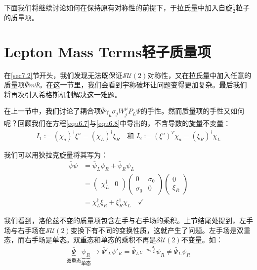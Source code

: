 下面我们将继续讨论如何在保持原有对称性的前提下，于拉氏量中加入自旋$\frac{1}{2}$粒子的质量项。


\section[轻子质量项]{Lepton Mass Terms\quad 轻子质量项}\label{sec7.5}

在\ref{sec7.2}节开头，我们发现无法既保证$\mathcal{SU}(2)$对称性，又在拉氏量中加入任意的质量项$\bar{\Psi}m\Psi$。在这一节里，我们会看到宇称破坏让问题变得更加复杂。最后我们将再次引入希格斯机制解决这一难题。

在上一节中，我们讨论了耦合项$\bar{\Psi}\gamma_\mu\sigma_jW_j^\mu P_L\Psi$的手性。然而质量项的手性又如何呢？回顾我们在方程\ref{equ6.7}与\ref{equ6.8}中导出的，不含导数的旋量不变量：
\begin{align}
I_1:=(\chi_a)^\dag\xi^{\dot a}=(\chi_L)^\dag\xi_R\quad\text{和 }I_2:=(\xi^a)^T\chi_a=(\xi_R)^\dag\chi_L
\label{equ7.113}
\end{align}

我们可以用狄拉克旋量将其写为：
\begin{align}
\bar{\psi}\psi&=\bar{\psi}_L\psi_R+\bar{\psi}_R\psi_L\nonumber\\
&=\begin{pmatrix}\chi_L^\dag & 0\end{pmatrix}\begin{pmatrix}0 & \sigma_0 \\ \sigma_0 & 0\end{pmatrix}\begin{pmatrix}0 \\ \xi_R\end{pmatrix}\nonumber\\
&=\chi_L^\dag\xi_R+\xi_R^\dag\chi_L\quad\checkmark
\label{equ7.114}
\end{align}

我们看到，洛伦兹不变的质量项包含左手与右手场的乘积。上节结尾处提到，左手场与右手场在$\mathcal{SU}(2)$变换下有不同的变换性质，这就产生了问题。左手场是双重态，而右手场是单态。双重态和单态的乘积不再是$\mathcal{SU}(2)$不变量。如：
\begin{align}
\underbrace{\bar{\Psi}}_\text{双重态}\underbrace{\psi_R}_\text{单态}\rightarrow \bar{\Psi}'_L\psi'_R=\bar{\Psi}_Le^{-ib_i\frac{\sigma_i}{2}}\psi_R\ne \bar{\Psi}_L\psi_R
\label{equ7.115}
\end{align}

